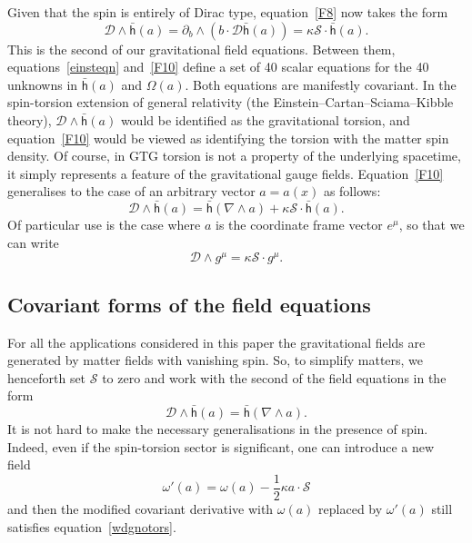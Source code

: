 \documentclass[a4paper]{article}
\numberwithin{equation}{section}
\newcommand{\dt}{\! \cdot \!}
\newcommand{\wdg}{\! \wedge \!}
\newcommand{\half}{{\textstyle \frac{1}{2}}}
\newcommand{\eqv}{=}
\newcommand{\kap}{\kappa}
\newcommand{\om}{\omega}
\newcommand{\Om}{\Omega}
\newcommand{\cld}{{\mathcal{D}}}
\newcommand{\cls}{{\mathcal{S}}}
\newcommand{\db}{\partial_b}
\newcommand{\lbh}{\bar{\mathsf{h}}}
\newcommand{\ho}{\lbh}
\newcommand{\grad}{\nabla}
\begin{document}
Given that the spin is entirely of Dirac type, equation~\eqref{F8} now
takes the form
%
\begin{equation}
\cld \wdg \ho(a) = \db \wdg (b \dt \cld \ho(a)) = \kap \cls \dt \ho(a).
\label{F10}
\end{equation} 
%
This is the second of our gravitational field equations.  Between
them, equations~\eqref{einsteqn} and~\eqref{F10} define a set of 40
scalar equations for the 40 unknowns in $\ho(a)$ and $\Om(a)$.  Both
equations are manifestly covariant.  In the spin-torsion extension of
general relativity (the Einstein--Cartan--Sciama--Kibble theory),
$\cld\wedge\ho(a)$ would be identified as the gravitational torsion, and
equation~\eqref{F10} would be viewed as identifying the torsion with
the matter spin density.  Of course, in GTG torsion is not a property
of the underlying spacetime, it simply represents a feature of the
gravitational gauge fields.  Equation~\eqref{F10} generalises to the
case of an arbitrary vector $a=a(x)$ as follows:
%
\begin{equation}
\cld \wdg \ho(a) = \ho(\grad \wdg a) + \kap \cls \dt \ho(a).
\label{wdgeqn} 
\end{equation} 
%
Of particular use is the case where $a$ is the coordinate frame vector
$e^\mu$, so that we can write
%
\begin{equation}
\cld \wdg g^\mu = \kap \cls \dt g^\mu.
\end{equation}



\subsection{Covariant forms of the field equations}

For all the applications considered in this paper the gravitational
fields are generated by matter fields with vanishing spin.  So, to
simplify matters, we henceforth set $\cls$ to zero and work with the
second of the field equations in the form
%
\begin{equation}
\cld \wdg \ho(a) = \ho(\grad \wdg a).
\label{wdgnotors}
\end{equation} 
%
It is not hard to make the necessary generalisations in the presence
of spin.  Indeed, even if the spin-torsion sector is significant, one
can introduce a new field~\cite{DGL98-spintor}
%
\begin{equation}
\om'(a) \eqv \om(a) - \half \kap a \dt \cls
\end{equation}
%
and then the modified covariant derivative with $\om(a)$ replaced by
$\om'(a)$ still satisfies equation~\eqref{wdgnotors}.  
\end{document}
